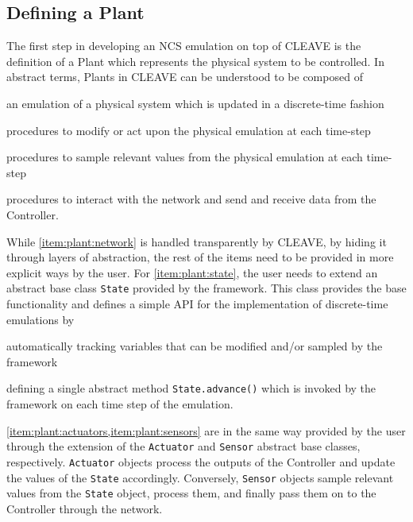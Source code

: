 \subsection{Defining a Plant}

The first step in developing an \ac{NCS} emulation on top of \ac{CLEAVE} is the definition of a Plant which represents the physical system to be controlled.
In abstract terms, Plants in \ac{CLEAVE} can be understood to be composed of
\begin{enumerate*}[itemjoin={{; }}, itemjoin*={{; and }}]
    \item\label{item:plant:state} an emulation of a physical system which is updated in a discrete-time fashion
    \item\label{item:plant:actuators} procedures to modify or act upon the physical emulation at each time-step
    \item\label{item:plant:sensors} procedures to sample relevant values from the physical emulation at each time-step
    \item\label{item:plant:network} procedures to interact with the network and send and receive data from the Controller.
\end{enumerate*}

While \cref{item:plant:network} is handled transparently by CLEAVE, by hiding it through layers of abstraction, the rest of the items need to be provided in more explicit ways by the user.
For \cref{item:plant:state}, the user needs to extend an abstract base class \texttt{State} provided by the framework.
This class provides the base functionality and defines a simple API for the implementation of discrete-time emulations by
\begin{enumerate*}[itemjoin={{; }}, itemjoin*={{; and }}]
    \item automatically tracking variables that can be modified and/or sampled by the framework
    \item defining a single abstract method \texttt{State.advance()} which is invoked by the framework on each time step of the emulation.
\end{enumerate*}
\cref{item:plant:actuators,item:plant:sensors} are in the same way provided by the user through the extension of the \texttt{Actuator} and \texttt{Sensor} abstract base classes, respectively.
\texttt{Actuator} objects process the outputs of the Controller and update the values of the \texttt{State} accordingly.
Conversely, \texttt{Sensor} objects sample relevant values from the \texttt{State} object, process them, and finally pass them on to the Controller through the network.

